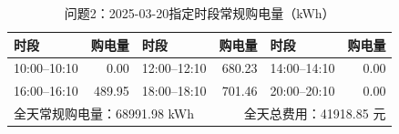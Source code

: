 \begin{table}[H]\centering\small
\caption{问题2：2025-03-20指定时段常规购电量（kWh）}
\label{tab:q2_0320_purchase}
\begin{tabular}{lrlrlr}\toprule
时段 & 购电量 & 时段 & 购电量 & 时段 & 购电量 \\\midrule
10:00--10:10 & 0.00 & 12:00--12:10 & 680.23 & 14:00--14:10 & 0.00 \\
16:00--16:10 & 489.95 & 18:00--18:10 & 701.46 & 20:00--20:10 & 0.00 \\
\midrule
\multicolumn{3}{l}{全天常规购电量：68991.98 kWh} & \multicolumn{3}{r}{全天总费用：41918.85 元}\\
\bottomrule\end{tabular}\end{table}
